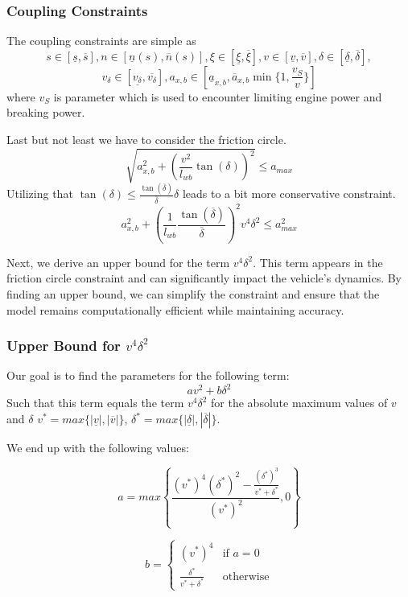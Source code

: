 \subsubsection{Coupling Constraints} \label{sec:kst_coupling_constraints}
The coupling constraints are simple as \[ s\in[\underline{s}, \overline{s}], n\in[\underline{n}(s), \overline{n}(s)], \xi \in [\underline{\xi},
		\overline{\xi}], v\in[\underline{v}, \overline{v}], \delta \in [\underline{\delta}, \overline{\delta}], \] \[ v_\delta \in [\underline{v_\delta},
		\overline{v_\delta}], a_{x,b} \in [\underline{a}_{x,b}, \overline{a}_{x,b}\min\{1, \frac{v_S}{v}\}] \] where $v_S$ is parameter which is used to
encounter limiting engine power and breaking power.

Last but not least we have to consider the friction circle.
\[
	\sqrt{a_{x,b}^2 + (\frac{v^2}{l_{wb}} \tan(\delta))^2} \leq a_{max}
\]
Utilizing that $\tan(\delta) \leq \frac{\tan(\overline{\delta})}{\overline{\delta}}\delta$ leads to a bit more conservative constraint.
\[
	a_{x,b}^2 + (\frac{1}{l_{wb}}\frac{\tan(\overline{\delta})}{\overline{\delta}})^2 v^4 \delta^2 \leq a_{max}^2
\]

Next, we derive an upper bound for the term \(v^4 \delta^2\).
This term appears in the friction circle constraint and can significantly impact the vehicle's dynamics.
By finding an upper bound, we can simplify the constraint and ensure that the model remains computationally efficient while maintaining accuracy.

\subsubsection{Upper Bound for \(v^4 \delta^2\)}

Our goal is to find the parameters for the following term: \[ a v^2 + b \delta^2 \] Such that this term equals the term \(v^4 \delta^2\) for the
absolute maximum values of \(v\) and \(\delta\) $v^* = max\{|\underline{v}|, |\overline{v}|\}$, $\delta^* = max\{|\underline{\delta}|,
	|\overline{\delta}|\}$.

We end up with the following values:

\[ a = max\left\{\frac{(v^*)^4 (\delta^*)^2 - \frac{(\delta^*)^3}{v^* + \delta^*}}{(v^*)^2},
	0\right\} \]

\[ b = \begin{cases}
		(v^*)^4                         & \text{if } a = 0 \\
		\frac{\delta^*}{v^* + \delta^*} & \text{otherwise}
	\end{cases} \]

